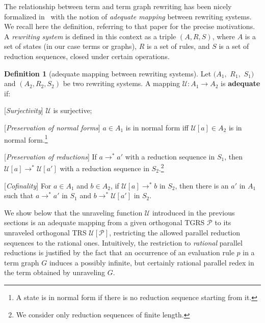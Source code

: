 \documentclass{eptcs}
\theoremstyle{plain}
\theoremstyle{definition}
\newtheorem{definition}[theorem]{Definition}
\begin{document}
The relationship between term and term graph rewriting has been nicely 
formalized in~\cite{KKSV:AGRS} with the notion of {\em adequate mapping} 
between rewriting systems. We recall here the definition, referring to 
that paper for the precise motivations. A {\em rewriting system} is 
defined in this context as a triple $(A, R, S)$, where $A$ is a set of 
states (in our case terms or graphs), $R$ is a set of rules, and $S$ 
is a set of reduction sequences, closed under certain operations.   

\begin{definition} 
[adequate mapping between rewriting systems]
\label{de:adequate mapping}
Let $(A_1,$ $ R_1,$ $ S_1)$ and $(A_2, R_2, S_2)$ be two rewriting systems. 
A mapping $\mathcal{U}: A_1 \rightarrow A_2$ is {\bf adequate} if:

\begin{description}
\item {[{\em Surjectivity}]} $\mathcal{U}$ is surjective;
\item {[{\em Preservation of normal forms}]} $a \in A_1$ is in normal 
form iff $\mathcal{U}[a] \in A_2$ is in normal form.\footnote{A state is 
in 
normal form if there is no reduction sequence starting from it.}

\item {[{\em Preservation of reductions}]} If $a \rightarrow^{*} a'$ 
with a reduction sequence in $S_1$, then $\mathcal{U}[a] \rightarrow^{*} 
\mathcal{U}[a']$ with a reduction sequence in $S_2$.\footnote{We consider 
only reduction sequences of finite length.} 

\item {[{\em Cofinality}]} For $a \in A_1$ and $b \in A_2$, if $\mathcal{
U}[a] \rightarrow^* b $ in $S_2$, then there is an $a'$ in $A_1$ such 
that $a \rightarrow^* a'$ in $S_1$ and $b \rightarrow^* \mathcal{U}[a']$ 
in $S_2$.
\end{description}
\end{definition}

We show below that the unraveling function $\mathcal{U}$ introduced in 
the previous sections is an adequate mapping from a given orthogonal 
TGRS 
$\mathcal{P}$ to its unraveled orthogonal TRS $\mathcal{U}[\mathcal{P}]$, 
restricting the allowed parallel reduction sequences to the rational 
ones. Intuitively, the restriction to \emph{rational} parallel reductions is
justified by the fact that an occurrence of an evaluation rule $p$ in a
term graph $G$ induces a possibly infinite, but certainly
rational parallel redex in the term obtained by unraveling $G$.  
\end{document}

